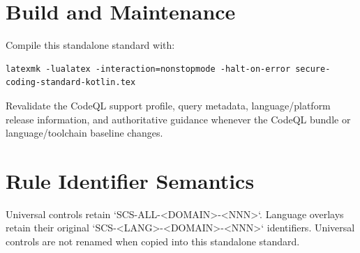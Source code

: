 \documentclass[10pt,letterpaper]{article}
\begin{document}
\appendix
\section{Build and Maintenance}
Compile this standalone standard with:
\begin{lstlisting}
latexmk -lualatex -interaction=nonstopmode -halt-on-error secure-coding-standard-kotlin.tex
\end{lstlisting}
Revalidate the CodeQL support profile, query metadata, language/platform release information, and authoritative guidance whenever the CodeQL bundle or language/toolchain baseline changes.

\section{Rule Identifier Semantics}
Universal controls retain `SCS-ALL-<DOMAIN>-<NNN>`. Language overlays retain their original `SCS-<LANG>-<DOMAIN>-<NNN>` identifiers. Universal controls are not renamed when copied into this standalone standard.
\end{document}
